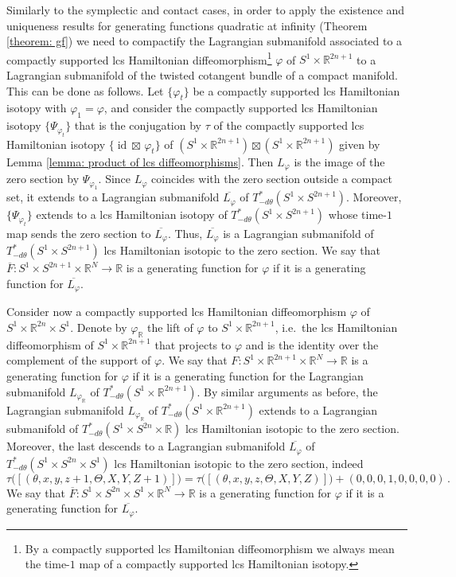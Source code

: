 \documentclass{amsart}
\DeclareMathOperator{\id}{id}
\theoremstyle{remark}
\begin{document}
Similarly to the symplectic and contact cases,
in order to apply the existence and uniqueness results
for generating functions quadratic at infinity
(Theorem \ref{theorem: gf})
we need to compactify the Lagrangian submanifold
associated to a compactly supported lcs Hamiltonian diffeomorphism\footnote{
By a compactly supported lcs Hamiltonian diffeomorphism
we always mean the time-$1$ map
of a compactly supported lcs Hamiltonian isotopy.}
$\varphi$ of $S^1 \times \mathbb{R}^{2n+1}$
to a Lagrangian submanifold of the twisted cotangent bundle of a compact manifold.
This can be done as follows.
Let $\{\varphi_t\}$ be a compactly supported lcs Hamiltonian isotopy
with $\varphi_1 = \varphi$,
and consider the compactly supported lcs Hamiltonian isotopy $\{ \Psi_{\varphi_t} \}$
that is the conjugation by $\tau$
of the compactly supported lcs Hamiltonian isotopy $\{ \id \boxtimes\, \varphi_t \}$
of $(S^1 \times \mathbb{R}^{2n+1}) \boxtimes (S^1 \times \mathbb{R}^{2n+1})$
given by Lemma \ref{lemma: product of lcs diffeomorphisms}.
Then $L_{\varphi}$ is the image of the zero section by $\Psi_{\varphi_1}$.
Since $L_{\varphi}$ coincides with the zero section
outside a compact set,
it extends to a Lagrangian submanifold
$\overline{L_{\varphi}}$ of $T_{-d\theta}^{\ast} (S^1 \times S^{2n+1})$.
Moreover,
$\{\Psi_{\varphi_t}\}$ extends to a lcs Hamiltonian isotopy
of $T_{-d\theta}^{\ast} (S^1 \times S^{2n+1})$
whose time-$1$ map sends the zero section to $\overline{L_{\varphi}}$.
Thus,
$\overline{L_{\varphi}}$ is a Lagrangian submanifold
of $T_{-d\theta}^{\ast} (S^1 \times S^{2n+1})$
lcs Hamiltonian isotopic to the zero section.
We say that
$\overline{F}: S^1 \times S^{2n+1} \times \mathbb{R}^N \rightarrow \mathbb{R}$
is a generating function for $\varphi$
if it is a generating function for $\overline{L_{\varphi}}$.

Consider now a compactly supported lcs Hamiltonian diffeomorphism
$\varphi$ of $S^1 \times \mathbb{R}^{2n} \times S^1$.
Denote by $\varphi_{\mathbb{R}}$
the lift of $\varphi$ to $S^1 \times \mathbb{R}^{2n+1}$,
i.e.\ the lcs Hamiltonian diffeomorphism of $S^1 \times \mathbb{R}^{2n+1}$
that projects to $\varphi$
and is the identity over the complement of the support of $\varphi$.
We say that
$F: S^1 \times \mathbb{R}^{2n+1} \times \mathbb{R}^N \rightarrow \mathbb{R}$
is a generating function for $\varphi$
if it is a generating function for the Lagrangian submanifold
$L_{\varphi_{\mathbb{R}}}$ of $T_{-d\theta}^{\ast} (S^1 \times \mathbb{R}^{2n+1})$.
By similar arguments as before,
the Lagrangian submanifold $L_{\varphi_{\mathbb{R}}}$
of $T_{-d\theta}^{\ast} (S^1 \times \mathbb{R}^{2n+1})$
extends to a Lagrangian submanifold
of $T_{-d\theta}^{\ast} (S^1 \times S^{2n} \times \mathbb{R})$
lcs Hamiltonian isotopic to the zero section.
Moreover,
the last descends to a Lagrangian submanifold $\overline{L_{\varphi}}$
of $T_{-d\theta}^{\ast} (S^1 \times S^{2n} \times S^1)$
lcs Hamiltonian isotopic to the zero section,
indeed
\[
\tau \big( [(\theta, x, y, z+1, \Theta, X, Y, Z+1)] \big)
= \tau \big( [(\theta, x, y, z, \Theta, X, Y, Z)] \big)
+ (0, 0, 0, 1, 0, 0, 0, 0) \,.
\]
We say that
$\overline{F}: S^1 \times S^{2n} \times S^1 \times \mathbb{R}^N \rightarrow \mathbb{R}$
is a generating function for $\varphi$
if it is a generating function for $\overline{L_{\varphi}}$.
\end{document}
